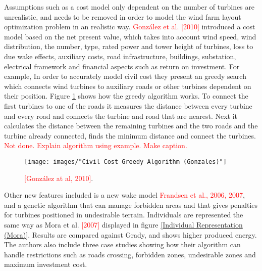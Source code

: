 Assumptions such as a cost model only dependent on the number of turbines are unrealistic, and needs to be removed in order to model the wind farm layout optimization problem in an realistic way. \textcolor{red}{González et al. [2010]} introduced a cost model based on the net present value, which takes into account wind speed, wind distribution, the number, type, rated power and tower height of turbines, loss to due wake effects, auxiliary costs, road infrastructure, buildings, substation, electrical framework and financial aspects such as return on investment. For example, In order to accurately model civil cost they present an greedy search which connects wind turbines to auxiliary roads or other turbines dependent on their position. Figure \ref{Civil Cost Greedy Algorithm (Gonzales)} shows how the greedy algorithm works. To connect the first turbines to one of the roads it measures the distance between every turbine and every road and connects the turbine and road that are nearest. Next it calculates the distance between the remaining turbines and the two roads and the turbine already connected, finds the minimum distance and connect the turbines. \textcolor{red}{Not done. Explain algorithm using example. Make caption.}


\begin{figure}[h!]
\begin{center}
\texttt{[image: images/"Civil Cost Greedy Algorithm (Gonzales)"]}
\caption{ \textcolor{red}{[González at al, 2010]}.}
\label{Civil Cost Greedy Algorithm (Gonzales)}
\end{center}
\end{figure}


\noindent Other new features included is a new wake model \textcolor{red}{Frandsen et al., 2006, 2007}, and a genetic algorithm that can manage forbidden areas and that gives penalties for turbines positioned in undesirable terrain. Individuals are represented the same way as Mora et al. \textcolor{red}{[2007]} displayed in figure \ref{Individual Representation (Mora)}. Results are compared against Grady, and shows higher produced energy. The authors also include three case studies showing how their algorithm can handle restrictions such as roads crossing, forbidden zones, undesirable zones and maximum investment cost.\\








